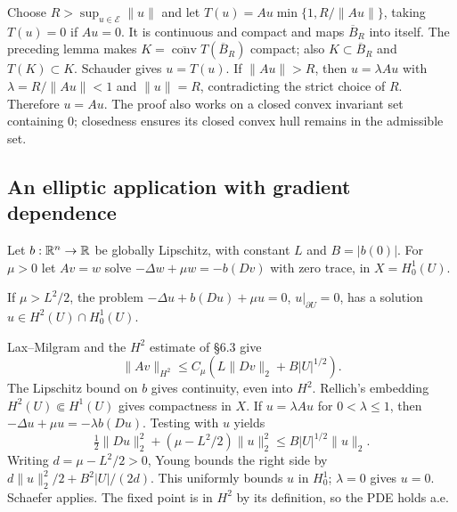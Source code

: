 \begin{expandedproof}
Choose $R>\sup_{u\in\mathcal E}\|u\|$ and let
$T(u)=Au\min\{1,R/\|Au\|\}$, taking $T(u)=0$ if $Au=0$.
It is continuous and compact and maps $\overline B_R$ into itself.
The preceding lemma makes $K=\overline{\operatorname{conv}}T(\overline B_R)$
compact; also $K\subset\overline B_R$ and $T(K)\subset K$.
Schauder gives $u=T(u)$. If $\|Au\|>R$, then
$u=\lambda Au$ with $\lambda=R/\|Au\|<1$ and $\|u\|=R$, contradicting
the strict choice of $R$. Therefore $u=Au$.
The proof also works on a closed convex invariant set containing $0$;
closedness ensures its closed convex hull remains in the admissible set.
\end{expandedproof}
\Needspace{42mm}

\Needspace{40mm}
\subsection{An elliptic application with gradient dependence}
Let $b:\mathbb{R}^n\to\mathbb{R}$ be globally Lipschitz, with constant $L$ and
$B=|b(0)|$. For $\mu>0$ let $Av=w$ solve
$-\Delta w+\mu w=-b(Dv)$ with zero trace, in $X=H^1_0(U)$.
\Needspace{50mm}
\begin{theorem}
If $\mu>L^2/2$, the problem
$-\Delta u+b(Du)+\mu u=0$, $u|_{\partial U}=0$, has a solution
$u\in H^2(U)\cap H^1_0(U)$.
\end{theorem}
\begin{expandedproof}
Lax--Milgram and the $H^2$ estimate of \S6.3 give
\[\|Av\|_{H^2}\leq C_\mu(L\|Dv\|_2+B|U|^{1/2}).\]
The Lipschitz bound on $b$ gives continuity, even into $H^2$.
Rellich's embedding $H^2(U)\Subset H^1(U)$ gives compactness in $X$.
If $u=\lambda Au$ for $0<\lambda\leq1$, then
$-\Delta u+\mu u=-\lambda b(Du)$. Testing with $u$ yields
\[
 \tfrac12\|Du\|_2^2+(\mu-L^2/2)\|u\|_2^2
 \leq B|U|^{1/2}\|u\|_2.
\]
Writing $d=\mu-L^2/2>0$, Young bounds the right side by
$d\|u\|_2^2/2+B^2|U|/(2d)$. This uniformly bounds $u$ in $H^1_0$;
$\lambda=0$ gives $u=0$. Schaefer applies. The fixed point is in $H^2$
by its definition, so the PDE holds a.e.
\end{expandedproof}
\Needspace{42mm}
